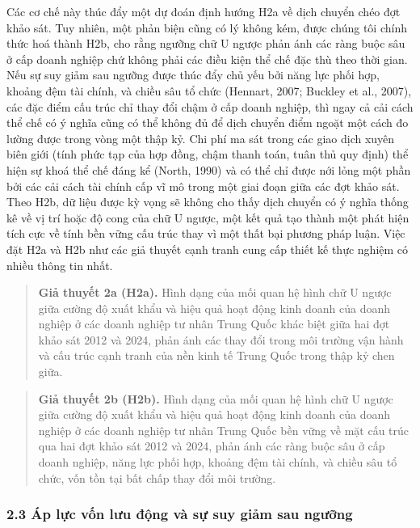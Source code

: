 \documentclass[12pt,a4paper]{article}
\begin{document}
Các cơ chế này thúc đẩy một dự đoán định hướng H2a về dịch chuyển chéo
đợt khảo sát. Tuy nhiên, một phản biện cũng có lý không kém, được chúng
tôi chính thức hoá thành H2b, cho rằng ngưỡng chữ U ngược phản ánh các
ràng buộc sâu ở cấp doanh nghiệp chứ không phải các điều kiện thể chế
đặc thù theo thời gian. Nếu sự suy giảm sau ngưỡng được thúc đẩy chủ yếu
bởi năng lực phối hợp, khoảng đệm tài chính, và chiều sâu tổ chức
(Hennart, 2007; Buckley et al., 2007), các đặc điểm cấu trúc chỉ thay
đổi chậm ở cấp doanh nghiệp, thì ngay cả cải cách thể chế có ý nghĩa
cũng có thể không đủ để dịch chuyển điểm ngoặt một cách đo lường được
trong vòng một thập kỷ. Chi phí ma sát trong các giao dịch xuyên biên
giới (tính phức tạp của hợp đồng, chậm thanh toán, tuân thủ quy định)
thể hiện sự khoá thể chế đáng kể (North, 1990) và có thể chỉ được nới
lỏng một phần bởi các cải cách tài chính cấp vĩ mô trong một giai đoạn
giữa các đợt khảo sát. Theo H2b, dữ liệu được kỳ vọng sẽ không cho thấy
dịch chuyển có ý nghĩa thống kê về vị trí hoặc độ cong của chữ U ngược,
một kết quả tạo thành một phát hiện tích cực về tính bền vững cấu trúc
thay vì một thất bại phương pháp luận. Việc đặt H2a và H2b như các giả
thuyết cạnh tranh cung cấp thiết kế thực nghiệm có nhiều thông tin nhất.

\begin{quote}
\textbf{Giả thuyết 2a (H2a).} Hình dạng của mối quan hệ hình chữ U ngược
giữa cường độ xuất khẩu và hiệu quả hoạt động kinh doanh của doanh
nghiệp ở các doanh nghiệp tư nhân Trung Quốc khác biệt giữa hai đợt khảo
sát 2012 và 2024, phản ánh các thay đổi trong môi trường vận hành và cấu
trúc cạnh tranh của nền kinh tế Trung Quốc trong thập kỷ chen giữa.
\end{quote}

\begin{quote}
\textbf{Giả thuyết 2b (H2b).} Hình dạng của mối quan hệ hình chữ U ngược
giữa cường độ xuất khẩu và hiệu quả hoạt động kinh doanh của doanh
nghiệp ở các doanh nghiệp tư nhân Trung Quốc bền vững về mặt cấu trúc
qua hai đợt khảo sát 2012 và 2024, phản ánh các ràng buộc sâu ở cấp
doanh nghiệp, năng lực phối hợp, khoảng đệm tài chính, và chiều sâu tổ
chức, vốn tồn tại bất chấp thay đổi môi trường.
\end{quote}

\hypertarget{23-uxe1p-lux1ef1c-vux1ed1n-lux1b0u-ux111ux1ed9ng-vuxe0-sux1ef1-suy-giux1ea3m-sau-ngux1b0ux1ee1ng}{%
\subsubsection{2.3 Áp lực vốn lưu động và sự suy giảm sau
ngưỡng}\label{23-uxe1p-lux1ef1c-vux1ed1n-lux1b0u-ux111ux1ed9ng-vuxe0-sux1ef1-suy-giux1ea3m-sau-ngux1b0ux1ee1ng}}
\end{document}
